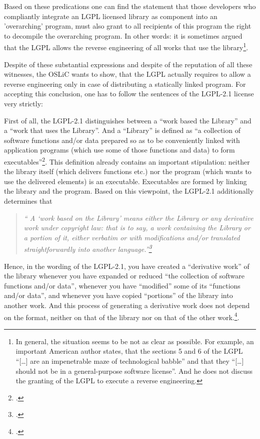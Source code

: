 Based on these predications one can find the statement that those developers who
compliantly integrate an LGPL licensed library as component into an
'overarching' program, must also grant to all recipients of this program the
right to decompile the overarching program.  In other words: it is sometimes argued
that the LGPL allows the reverse engineering of all works that use the
library\footnote{In general, the situation seems to be not as clear as possible.
For example, an important American author states, that the sections 5 and 6 of
the LGPL \enquote{[\ldots] are an impenetrable maze of technological babble} and
that they \enquote{[\ldots] should not be in a general-purpose software
license}\cite[cf.][124]{Rosen2005a}. And he does not discuss the granting of
the LGPL to execute a reverse engineering.}.

Despite of these substantial expressions and despite of the reputation of all
these witnesses, the OSLiC wants to show, that the LGPL actually requires to
allow a reverse engineering only in case of distributing a statically linked
program. For accepting this conclusion, one has to follow the sentences of the
LGPL-2.1 license very strictly:

First of all, the LGPL-2.1 distinguishes between a \enquote{work based the
Library} and a \enquote{work that uses the Library}. And a \enquote{Library} is
defined as \enquote{a collection of software functions and/or data prepared so
as to be conveniently linked with application programs (which use some of those
functions and data) to form executables}\footcite[cf.][\nopage
wp §0]{Lgpl21OsiLicense1999a}. This definition already contains an important
stipulation: neither the library itself (which delivers functions etc.) nor the
program (which wants to use the delivered elements) is an executable.
Executables are formed by linking the library and the program. Based on this
viewpoint, the LGPL-2.1 additionally determines that 

\begin{quote}\emph{\enquote{
A \enquote{work based on the Library} means either the Library or any derivative
work under copyright law: that is to say, a work containing the Library or a portion
of it, either verbatim or with modifications and/or translated straightforwardly
into another language.}\footcite[cf.][\nopage wp §0]{Lgpl21OsiLicense1999a} }
\end{quote}

Hence, in the wording of the LGPL-2.1, you have created a \enquote{derivative
work} of the library whenever you have expanded or reduced \enquote{the
collection of software functions and/or data}, whenever you have
\enquote{modified} some of its \enquote{functions and/or data}, and whenever you
have copied \enquote{portions} of the library into another work. And this
process of generating a derivative work does not depend on the format, neither
on that of the library nor on that of the other work.\footcite[cf.][\nopage wp
§0]{Lgpl21OsiLicense1999a}.

